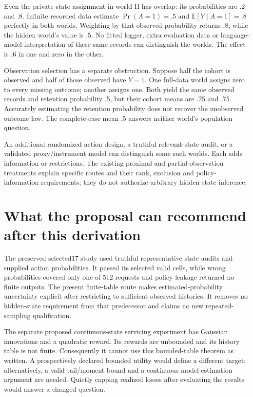 Even the private-state assignment in world H has overlap: its
probabilities are .2 and .8. Infinite recorded data estimate
\(\Pr(A=1)=.5\) and \(\mathbb E[Y\mid A=1]=.8\) perfectly in both
worlds. Weighting by that observed probability returns .8, while the
hidden world's value is .5. No fitted logger, extra evaluation data or
language-model interpretation of these same records can distinguish the
worlds. The effect is .6 in one and zero in the other.

Observation selection has a separate obstruction. Suppose half the
cohort is observed and half of those observed have \(Y=1\). One
full-data world assigns zero to every missing outcome; another assigns
one. Both yield the same observed records and retention probability .5,
but their cohort means are .25 and .75. Accurately estimating the
retention probability does not recover the unobserved outcome law. The
complete-case mean .5 answers neither world's population question.

An additional randomized action design, a truthful relevant-state audit,
or a validated proxy/instrument model can distinguish some such worlds.
Each adds information or restrictions. The existing proximal and
partial-observation treatments explain specific routes and their rank,
exclusion and policy-information requirements; they do not authorize
arbitrary hidden-state inference.
\citep{bennettprox2023,tennenholtz2020}

\hypertarget{what-the-proposal-can-recommend-after-this-derivation}{%
\section{What the proposal can recommend after this
derivation}\label{what-the-proposal-can-recommend-after-this-derivation}}

The preserved selected17 study used truthful representative state audits
and supplied action probabilities. It passed its selected valid cells,
while wrong probabilities covered only one of 512 requests and policy
leakage returned no finite outputs. The present finite-table route makes
estimated-probability uncertainty explicit after restricting to
sufficient observed histories. It removes no hidden-state requirement
from that predecessor and claims no new repeated-sampling qualification.
\citep{exec13_servicing_predecessor}

The separate proposed continuous-state servicing experiment has Gaussian
innovations and a quadratic reward. Its rewards are unbounded and its
history table is not finite. Consequently it cannot use this
bounded-table theorem as written. A prospectively declared bounded
utility would define a different target; alternatively, a valid
tail/moment bound and a continuous-model estimation argument are needed.
Quietly capping realized losses after evaluating the results would
answer a changed question.

